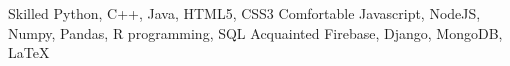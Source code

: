 
\begin{cvhonors}
  \cvhonor
    {Skilled}
    {Python, C++, Java, HTML5, CSS3}
    {}
    {}
  \cvhonor
    {Comfortable}
    {Javascript, NodeJS, Numpy, Pandas, R programming, SQL}
    {}
    {}
  \cvhonor
    {Acquainted}
    {Firebase, Django, MongoDB, \LaTeX}
    {}
    {}
\end{cvhonors}

